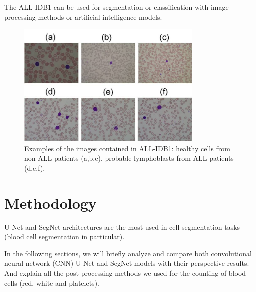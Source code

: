 \documentclass[conference]{IEEEtran}
\begin{document}
The ALL-IDB1 can be used for segmentation or classification with image processing methods or artificial intelligence models.
\begin{figure}[h]
\centering
\includegraphics[width=3.5in]{images/ALLIDB1.jpg}
\caption{Examples of the images contained in ALL-IDB1: healthy cells from non-ALL patients (a,b,c), probable lymphoblasts from ALL patients (d,e,f). }
\label{img1}
\end{figure}


\section{Methodology}
U-Net and SegNet architectures are the most used in cell segmentation tasks (blood cell segmentation in particular).

In the following sections, we will briefly analyze and compare both convolutional neural network (CNN) U-Net and SegNet models with their perspective results.
And explain all the post-processing methods we used for the counting of blood cells (red, white and platelets).
\end{document}
